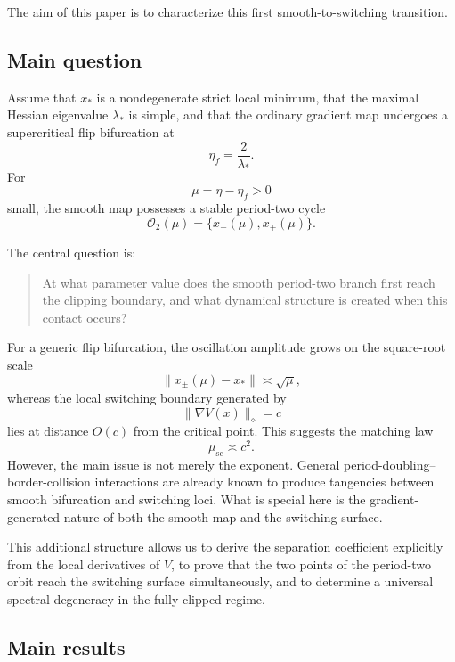 The aim of this paper is to characterize this first
smooth-to-switching transition.

\subsection{Main question}
\label{subsec:intro-main-question}

Assume that $x_*$ is a nondegenerate strict local minimum,
that the maximal Hessian eigenvalue $\lambda_*$ is simple, and that
the ordinary gradient map undergoes a supercritical flip bifurcation
at
\[
\eta_f=\frac{2}{\lambda_*}.
\]
For
\[
\mu=\eta-\eta_f>0
\]
small, the smooth map possesses a stable period-two cycle
\begin{equation}
\mathcal O_2(\mu)
=
\{x_-(\mu),x_+(\mu)\}.
\label{eq:intro-cycle}
\end{equation}

The central question is:

\begin{quote}
At what parameter value does the smooth period-two branch first reach
the clipping boundary, and what dynamical structure is created when
this contact occurs?
\end{quote}

For a generic flip bifurcation, the oscillation amplitude grows on the
square-root scale
\[
\|x_\pm(\mu)-x_*\|
\asymp
\sqrt{\mu},
\]
whereas the local switching boundary generated by
\[
\|\nabla V(x)\|_\diamond=c
\]
lies at distance $O(c)$ from the critical point.  This suggests the
matching law
\[
\mu_{\mathrm{sc}}
\asymp
c^2.
\]
However, the main issue is not merely the exponent.  General
period-doubling--border-collision interactions are already known to
produce tangencies between smooth bifurcation and switching loci.
What is special here is the gradient-generated nature of both the
smooth map and the switching surface.

This additional structure allows us to derive the separation
coefficient explicitly from the local derivatives of $V$, to prove
that the two points of the period-two orbit reach the switching
surface simultaneously, and to determine a universal spectral
degeneracy in the fully clipped regime.

\subsection{Main results}
\label{subsec:intro-results}


